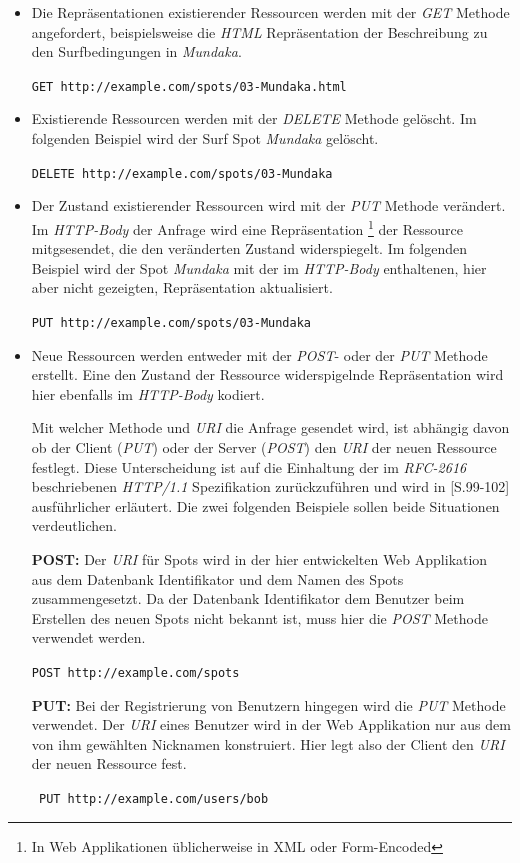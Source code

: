\begin{itemize}
\item Die Repräsentationen existierender Ressourcen werden mit der
  \textit{GET} Methode angefordert, beispielsweise die \textit{HTML}
  Repräsentation der Beschreibung zu den Surfbedingungen in
  \textit{Mundaka}.

  \texttt{GET http://example.com/spots/03-Mundaka.html}

\item Existierende Ressourcen werden mit der \textit{DELETE} Methode
  gelöscht. Im folgenden Beispiel wird der Surf Spot \textit{Mundaka}
  gelöscht.

  \texttt{DELETE http://example.com/spots/03-Mundaka}

\item Der Zustand existierender Ressourcen wird mit der \textit{PUT}
  Methode verändert. Im \textit{HTTP-Body} der Anfrage wird eine
  Repräsentation \footnote{In Web Applikationen üblicherweise in XML
    oder Form-Encoded} der Ressource mitgsesendet, die den veränderten
  Zustand widerspiegelt. Im folgenden Beispiel wird der Spot
  \textit{Mundaka} mit der im \textit{HTTP-Body} enthaltenen, hier
  aber nicht gezeigten, Repräsentation aktualisiert.

  \texttt{PUT http://example.com/spots/03-Mundaka}

\item Neue Ressourcen werden entweder mit der \textit{POST}- oder der
  \textit{PUT} Methode erstellt. Eine den Zustand der Ressource
  widerspigelnde Repräsentation wird hier ebenfalls im
  \textit{HTTP-Body} kodiert.

  Mit welcher Methode und \textit{URI} die Anfrage gesendet wird, ist
  abhängig davon ob der Client (\textit{PUT}) oder der Server
  (\textit{POST}) den \textit{URI} der neuen Ressource festlegt. Diese
  Unterscheidung ist auf die Einhaltung der im \textit{RFC-2616}
   beschriebenen
  \textit{HTTP/1.1} Spezifikation zurückzuführen und wird in
  \cite{Richardson07}[S.99-102] ausführlicher erläutert. Die zwei
  folgenden Beispiele sollen beide Situationen verdeutlichen.

  \textbf{POST:} Der \textit{URI} für Spots wird in der hier
  entwickelten Web Applikation aus dem Datenbank Identifikator und dem
  Namen des Spots zusammengesetzt. Da der Datenbank Identifikator dem
  Benutzer beim Erstellen des neuen Spots nicht bekannt ist, muss hier
  die \textit{POST} Methode verwendet werden.

  \texttt{POST http://example.com/spots}

  \textbf{PUT:} Bei der Registrierung von Benutzern hingegen wird die
  \textit{PUT} Methode verwendet. Der \textit{URI} eines Benutzer wird
  in der Web Applikation nur aus dem von ihm gewählten Nicknamen
  konstruiert. Hier legt also der Client den \textit{URI} der neuen
  Ressource fest.

  \texttt{ PUT http://example.com/users/bob}

\end{itemize}

